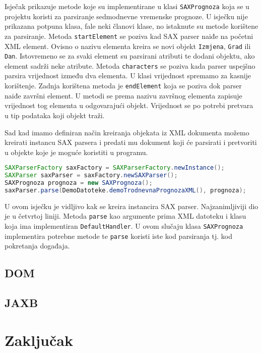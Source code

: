 \documentclass[]{foi}
\begin{document}
Isječak prikazuje metode koje su implementirane u klasi \texttt{SAXPrognoza} koja se u
projektu koristi za parsiranje sedmodnevne vremenske prognoze. U isječku nije prikazana
potpuna klasa, fale neki članovi klase, no istaknute su metode korištene za parsiranje.
Metoda \texttt{startElement} se poziva kad SAX parser naiđe na početni XML element. Ovisno
o nazivu elementa kreira se novi objekt \texttt{Izmjena}, \texttt{Grad} ili \texttt{Dan}. Istovremeno se za svaki
element su parsirani atributi te dodani objektu, ako element sadrži neke atribute. Metoda
\texttt{characters} se poziva kada parser uspejšno parsira vrijednost između dva elementa.
U klasi vrijednost spremamo za kasnije korištenje. Zadnja korištena metoda je \texttt{endElement}
koja se poziva dok parser naiđe završni element. U metodi se prema nazivu završnog elementa
zapisuje vrijednost tog elementa u odgovarajući objekt. Vrijednost se po potrebi pretvara
u tip podataka koji objekt traži.

Sad kad imamo definiran način kreiranja objekata iz XML dokumenta možemo kreirati instancu
SAX parsera i predati mu dokument koji će parsirati i pretvoriti u objekte koje je moguće
koristiti u programu.

\begin{lstlisting}[language=java, caption={Kreiranje instance SAX parsera i parsiranje XML datoteke}]
SAXParserFactory saxFactory = SAXParserFactory.newInstance();
SAXParser saxParser = saxFactory.newSAXParser();
SAXPrognoza prognoza = new SAXPrognoza();
saxParser.parse(DemoDatoteke.demoTrodnevnaPrognozaXML(), prognoza);
\end{lstlisting}

U ovom isječku je vidljivo kak se kreira instancira SAX parser. Najzanimljiviji dio
je u četvrtoj liniji. Metoda \texttt{parse} kao argumente prima XML datoteku i klasu
koja ima implementiran \texttt{DefaultHandler}. U ovom slučaju klasa \texttt{SAXPrognoza}
implementira potrebne metode te \texttt{parse} koristi iste kod parsiranja tj. kod
pokretanja događaja.

\section{DOM}
\section{JAXB}

\chapter{Zaključak}

\makebackmatter
\end{document}
